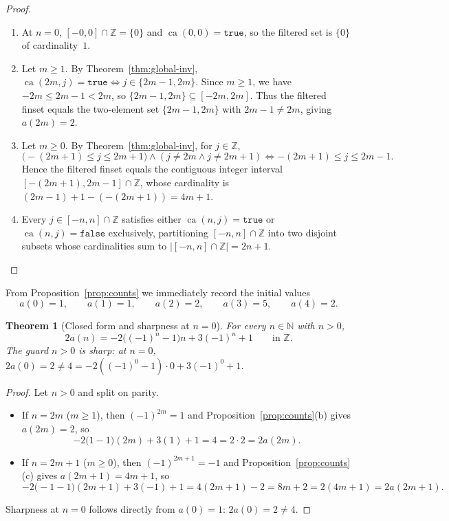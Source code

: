 \documentclass[11pt]{article}
\newtheorem{theorem}{Theorem}[section]
\theoremstyle{definition}
\newcommand{\N}{\mathbb{N}}
\newcommand{\Z}{\mathbb{Z}}
\newcommand{\ca}{\operatorname{ca}}
\begin{document}
\begin{proof}
\begin{enumerate}
\item[\textup{(a)}] At $n = 0$, $[-0, 0] \cap \Z = \{0\}$ and $\ca(0, 0) = \mathtt{true}$, so the filtered set is $\{0\}$ of cardinality~$1$.
\item[\textup{(b)}] Let $m \ge 1$. By Theorem~\ref{thm:global-inv}, $\ca(2m, j) = \mathtt{true} \iff j \in \{2m - 1, 2m\}$. Since $m \ge 1$, we have $-2m \le 2m - 1 < 2m$, so $\{2m - 1, 2m\} \subseteq [-2m, 2m]$. Thus the filtered finset equals the two-element set $\{2m - 1, 2m\}$ with $2m - 1 \ne 2m$, giving $a(2m) = 2$.
\item[\textup{(c)}] Let $m \ge 0$. By Theorem~\ref{thm:global-inv}, for $j \in \Z$,
\[
\bigl(-(2m + 1) \le j \le 2m + 1\bigr) \land (j \ne 2m \land j \ne 2m + 1) \iff -(2m + 1) \le j \le 2m - 1.
\]
Hence the filtered finset equals the contiguous integer interval $[-(2m + 1), 2m - 1] \cap \Z$, whose cardinality is $(2m - 1) + 1 - (-(2m + 1)) = 4m + 1$.
\item[\textup{(d)}] Every $j \in [-n, n] \cap \Z$ satisfies either $\ca(n, j) = \mathtt{true}$ or $\ca(n, j) = \mathtt{false}$ exclusively, partitioning $[-n, n] \cap \Z$ into two disjoint subsets whose cardinalities sum to $|[-n, n] \cap \Z| = 2n + 1$. \qedhere
\end{enumerate}
\end{proof}

From Proposition~\ref{prop:counts} we immediately record the initial values
\begin{equation}
\label{eq:init-vals}
a(0) = 1, \qquad a(1) = 1, \qquad a(2) = 2, \qquad a(3) = 5, \qquad a(4) = 2.
\end{equation}

\begin{theorem}[Closed form and sharpness at $n = 0$]
\label{thm:closed-form}
For every $n \in \N$ with $n > 0$,
\[
2 a(n) = -2\bigl((-1)^n - 1\bigr)n + 3(-1)^n + 1 \qquad \text{in }\Z.
\]
The guard $n > 0$ is sharp: at $n = 0$, $2a(0) = 2 \ne 4 = -2((-1)^0 - 1)\cdot 0 + 3(-1)^0 + 1$.
\end{theorem}

\begin{proof}
Let $n > 0$ and split on parity.
\begin{itemize}
\item If $n = 2m$ ($m \ge 1$), then $(-1)^{2m} = 1$ and Proposition~\ref{prop:counts}(b) gives $a(2m) = 2$, so
\[
-2\bigl(1 - 1\bigr)(2m) + 3(1) + 1 = 4 = 2 \cdot 2 = 2a(2m).
\]
\item If $n = 2m + 1$ ($m \ge 0$), then $(-1)^{2m+1} = -1$ and Proposition~\ref{prop:counts}(c) gives $a(2m + 1) = 4m + 1$, so
\[
-2\bigl(-1 - 1\bigr)(2m + 1) + 3(-1) + 1 = 4(2m + 1) - 2 = 8m + 2 = 2(4m + 1) = 2a(2m + 1).
\]
\end{itemize}
Sharpness at $n = 0$ follows directly from $a(0) = 1$: $2a(0) = 2 \ne 4$.
\end{proof}
\end{document}
